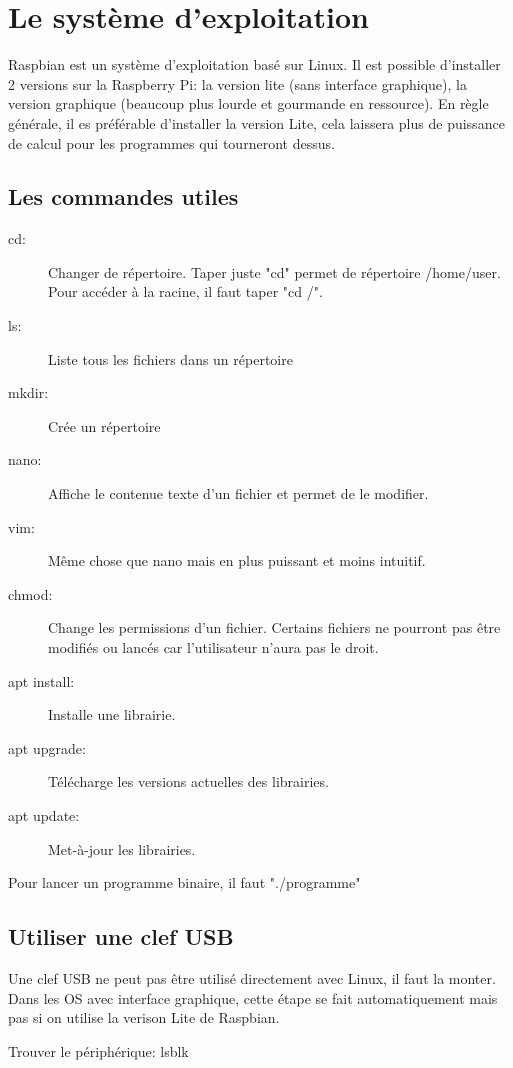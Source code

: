 \documentclass[a4paper, 11pt]{report}
\begin{document}
\section{Le système d'exploitation}
Raspbian est un système d'exploitation basé sur Linux. Il est possible d'installer 2 versions sur la Raspberry Pi: la version lite (sans interface graphique), la version graphique (beaucoup plus lourde et gourmande en ressource). En règle générale, il es préférable d'installer la version Lite, cela laissera plus de puissance de calcul pour les programmes qui tourneront dessus.

\subsection{Les commandes utiles}
\begin{description}
\item[cd:] Changer de répertoire. Taper juste "cd" permet de répertoire /home/user. Pour accéder à la racine, il faut taper "cd /".
\item[ls:] Liste tous les fichiers dans un répertoire
\item[mkdir:] Crée un répertoire
\item[nano:] Affiche le contenue texte d'un fichier et permet de le modifier.
\item[vim:] Même chose que nano mais en plus puissant et moins intuitif.
\item[chmod:] Change les permissions d'un fichier. Certains fichiers ne pourront pas être modifiés ou lancés car l'utilisateur n'aura pas le droit.
\item[apt install:] Installe une librairie.
\item[apt upgrade:] Télécharge les versions actuelles des librairies.
\item[apt update:] Met-à-jour les librairies.
\end{description}

Pour lancer un programme binaire, il faut "./programme"

\subsection{Utiliser une clef USB}
Une clef USB ne peut pas être utilisé directement avec Linux, il faut la monter. Dans les OS avec interface graphique, cette étape se fait automatiquement mais pas si on utilise la verison Lite de Raspbian.

Trouver le périphérique:
lsblk
\end{document}
